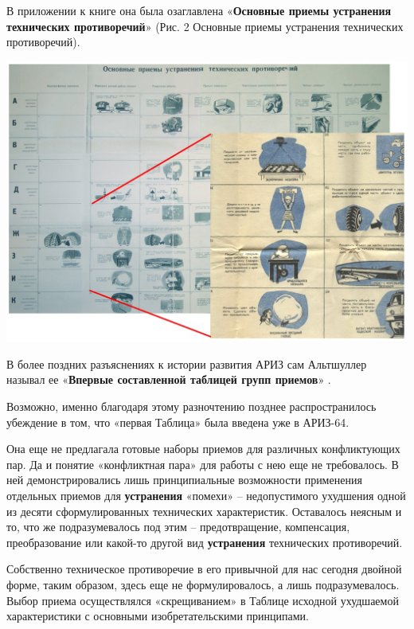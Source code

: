 \documentclass[11pt,a4paper]{article}
\begin{document}
В приложении к книге она была озаглавлена «\textbf{Основные приемы устранения
  технических противоречий}» (Рис. 2 Основные приемы устранения технических
противоречий).

\begin{center}
  \includegraphics[width=.7\textwidth]{./17.jpg}
\end{center}

В более поздних разъяснениях к истории развития АРИЗ сам Альтшуллер называл ее
«\textbf{Впервые составленной таблицей групп приемов}» \cite{Altshuller1986a}.

Возможно, именно благодаря этому разночтению позднее распространилось
убеждение в том, что «первая Таблица» была введена уже в АРИЗ-64.

Она еще не предлагала готовые наборы приемов для различных конфликтующих пар.
Да и понятие «конфликтная пара» для работы с нею еще не требовалось. В ней
демонстрировались лишь принципиальные возможности применения отдельных приемов
для \textbf{устранения} «помехи» -- недопустимого ухудшения одной из десяти
сформулированных технических характеристик. Оставалось неясным и то, что же
подразумевалось под этим -- предотвращение, компенсация, преобразование или
какой-то другой вид \textbf{устранения} технических противоречий.

Собственно техническое противоречие в его привычной для нас сегодня двойной
форме, таким образом, здесь еще не формулировалось, а лишь подразумевалось.
Выбор приема осуществлялся «скрещиванием» в Таблице исходной ухудшаемой
характеристики с основными изобретательскими принципами.
\end{document}

